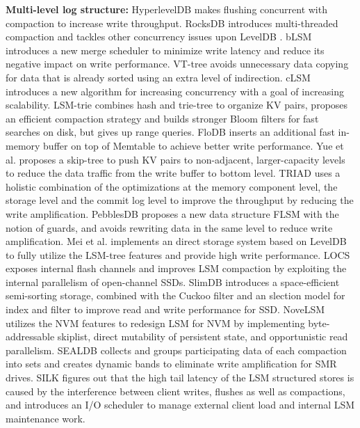 \documentclass[sigconf]{acmart}
\begin{document}
\textbf{Multi-level log structure:} HyperlevelDB \cite{HyperLevelDB} makes flushing concurrent with compaction to increase write throughput. RocksDB \cite{RocksDB} introduces multi-threaded compaction and tackles other concurrency issues upon LevelDB \cite{LevelDB}. bLSM \cite{bLSM} introduces a new merge scheduler to minimize write latency and reduce its negative impact on write performance. VT-tree \cite{VTtree} avoids unnecessary data copying for data that is already sorted using an extra level of indirection. cLSM \cite{cLSM} introduces a new algorithm for increasing concurrency with a goal of increasing scalability. LSM-trie \cite{LSMtrie} combines hash and trie-tree to organize KV pairs, proposes an efficient compaction strategy and builds stronger Bloom filters for fast searches on disk, but gives up range queries. FloDB \cite{FloDB} inserts an additional fast in-memory buffer on top of Memtable to achieve better write performance. Yue et al. \cite{skiptree} proposes a skip-tree to push KV pairs to non-adjacent, larger-capacity levels to reduce the data traffic from the write buffer to bottom level. TRIAD \cite{TRIAD} uses a holistic combination of the optimizations at the memory component level, the storage level and the commit log level to improve the throughput by reducing the write amplification. PebblesDB \cite{PebblesDB} proposes a new data structure FLSM with the notion of guards, and avoids rewriting data in the same level to reduce write amplification. Mei et al. \cite{LDS} implements an direct storage system based on LevelDB to fully utilize the LSM-tree features and provide high write performance. LOCS\cite{LOCS} exposes internal flash channels and improves LSM compaction by exploiting the internal parallelism of open-channel SSDs. SlimDB \cite{SlimDB} introduces a space-efficient semi-sorting storage, combined with the Cuckoo filter and an slection model for index and filter to improve read and write performance for SSD. NoveLSM \cite{NoveLSM} utilizes the NVM features to redesign LSM for NVM by implementing byte-addressable skiplist, direct mutability of persistent state, and opportunistic read parallelism. SEALDB \cite{SEALDB} collects and groups participating data of each compaction into sets and creates dynamic bands to eliminate write amplification for SMR drives. SILK \cite{SILK} figures out that the high tail latency of the LSM structured stores is caused by the interference between client writes, flushes as well as compactions, and introduces an I/O scheduler to manage external client load and internal LSM maintenance work.
\end{document}
